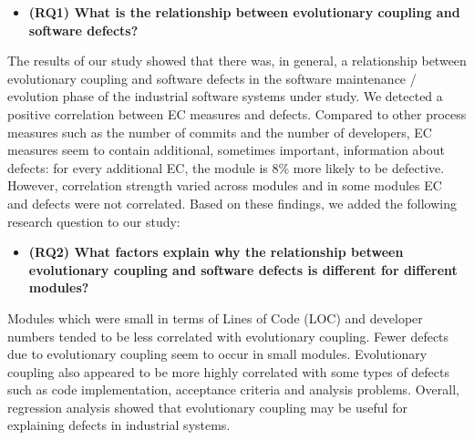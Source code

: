 \documentclass[times]{smrauth}
\begin{document}
\begin{itemize}
\renewcommand{\labelitemi}{$\bullet$}
\item \textbf{(RQ1) What is the relationship between evolutionary coupling and software defects?}
\end{itemize}

The results of our study showed that there was, in general, a relationship between evolutionary coupling and software defects in the software maintenance / evolution phase of the industrial software systems under study. We detected a positive correlation between EC measures and defects. Compared to other process measures such as the number of commits and the number of developers, EC measures seem to contain additional, sometimes important, information about defects: for every additional EC, the module is 8\% more likely to be defective. However, correlation strength varied across modules and in some modules EC and defects were not correlated. Based on these findings, we added the following research question to our study:

\begin{itemize}
\renewcommand{\labelitemi}{$\bullet$}
\item \textbf{(RQ2) What factors explain why the relationship between evolutionary coupling and software defects is different for different modules?}

\end{itemize}

Modules which were small in terms of Lines of Code (LOC) and developer numbers tended to be less correlated with evolutionary coupling. Fewer defects due to evolutionary coupling seem to occur in small modules. Evolutionary coupling also appeared to be more highly correlated with some types of defects such as code implementation, acceptance criteria and analysis problems. Overall, regression analysis showed that evolutionary coupling may be useful for explaining defects in industrial systems. 
\end{document}
